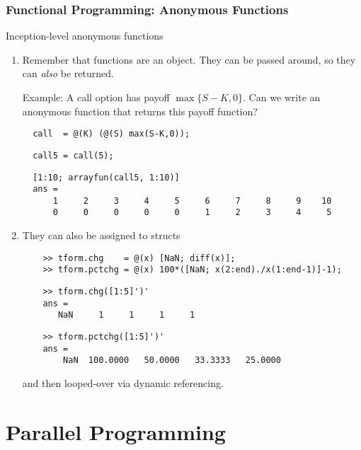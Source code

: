\documentclass{beamer}
\begin{document}
  \begin{frame}[fragile,shrink=10]
    \frametitle{Functional Programming: Anonymous Functions}

    Inception-level anonymous functions
    \begin{enumerate}
      \item Remember that functions are an object. They can be passed
        around, so they can \emph{also} be returned.

        Example: A call option has payoff $\max\{S-K,0\}$. Can we write
        an anonymous function that returns this payoff function?\pause
\begin{lstlisting}
  call  = @(K) (@(S) max(S-K,0));
\end{lstlisting}\pause
\begin{lstlisting}
  call5 = call(5);
\end{lstlisting}\pause
\begin{lstlisting}
  [1:10; arrayfun(call5, 1:10)]
  ans =
      1     2     3     4     5     6     7     8     9    10
      0     0     0     0     0     1     2     3     4     5
\end{lstlisting}
      \item They can also be assigned to structs
  \begin{lstlisting}
    >> tform.chg    = @(x) [NaN; diff(x)];
    >> tform.pctchg = @(x) 100*([NaN; x(2:end)./x(1:end-1)]-1);
  \end{lstlisting}\pause
  \begin{lstlisting}
    >> tform.chg([1:5]')'
    ans =
       NaN     1     1     1     1
    \end{lstlisting}
    \begin{lstlisting}
    >> tform.pctchg([1:5]')'
    ans =
        NaN  100.0000   50.0000   33.3333   25.0000
  \end{lstlisting}
      and then looped-over via dynamic referencing.

    \end{enumerate}

	\end{frame}


\section{Parallel Programming}
\end{document}
